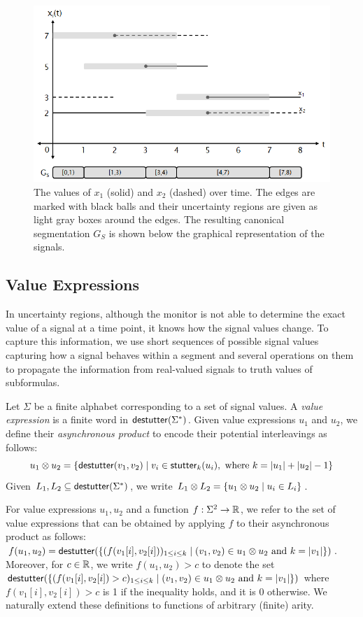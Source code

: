 \begin{figure} 
	\centering
	\includegraphics[scale=0.45]{canonseg.png}
	\caption{The values of $x_1$ (solid) and $x_2$ (dashed) over time. The edges are marked with black balls and their uncertainty regions are given as light gray boxes around the edges. The resulting canonical segmentation $G_S$ is shown below the graphical representation of the signals.\label{fig:canonseg}}
\end{figure}



\subsection{Value Expressions}
In uncertainty regions, although the monitor is not able to determine the exact value of a signal at a time point, it knows how the signal values change.
To capture this information, we use short sequences of possible signal values capturing how a signal behaves within a segment and several operations on them to propagate the information from real-valued signals to truth values of subformulas.

Let $\Sigma$ be a finite alphabet corresponding to a set of signal values.
A \emph{value expression} is a finite word in $\mathsf{destutter}(\Sigma^*)$.
Given value expressions $u_1$ and $u_2$, we define their \emph{asynchronous product} to encode their potential interleavings as follows:
\small
$$u_1 \otimes u_2 = \{ \destutter(v_1, v_2) \st v_i \in \stutter_k(u_i), \text{ where } k = |u_1| + |u_2| - 1\}$$  
\normalsize
Given $L_1, L_2 \subseteq \mathsf{destutter}(\Sigma^*)$, we write $L_1 \otimes L_2 = \{ u_1 \otimes u_2 \st u_i \in L_i\}$.

For value expressions $u_1, u_2$ and a function $f : \Sigma^2 \to \mathbb{R}$, we refer to the set of value expressions that can be obtained by applying $f$ to their asynchronous product as follows: $f(u_1, u_2) = \destutter(\{(f(v_1[i], v_2[i]))_{1 \leq i \leq k} \st (v_1, v_2) \in u_1 \otimes u_2 \text{ and } k = |v_1| \})$.
Moreover, for $c \in \mathbb{R}$, we write $f(u_1, u_2) > c$ to denote the set $\destutter(\{(f(v_1[i], v_2[i]) > c)_{1 \leq i \leq k} \st (v_1, v_2) \in u_1 \otimes u_2 \text{ and } k = |v_1|\})$ where $f(v_1[i], v_2[i]) > c$ is 1 if the inequality holds, and it is 0 otherwise.
We naturally extend these definitions to functions of arbitrary (finite) arity.

